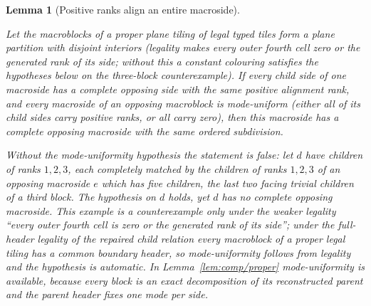 \documentclass[11pt,a4paper]{article}
\newtheorem{lemma}[definition]{Lemma}
\theoremstyle{remark}
\newcommand{\lean}[1]{}
\newcommand{\uses}[1]{}
\begin{document}
\begin{lemma}[Positive ranks align an entire macroside]
\label{lem:comp/alignment}
\lean{Tilings.Planned.alignment_complete}
\uses{def:certificate,def:tiling,def:control/substitution}
Let the macroblocks of a proper plane tiling of legal typed tiles form a
plane partition with disjoint interiors (legality makes every outer fourth
cell zero or the generated rank of its side; without this a constant
colouring satisfies the hypotheses below on the three-block counterexample).
If every child side of one macroside has a complete opposing side with the
same positive alignment rank, \emph{and every macroside of an opposing
macroblock is mode-uniform} (either all of its child sides carry positive
ranks, or all carry zero), then this macroside has a complete opposing
macroside with the same ordered subdivision.

Without the mode-uniformity hypothesis the statement is false: let $d$
have children of ranks $1,2,3$, each completely matched by the children of
ranks $1,2,3$ of an opposing macroside $e$ which has five children, the
last two facing trivial children of a third block. The hypothesis on $d$
holds, yet $d$ has no complete opposing macroside. This example is a
counterexample only under the weaker legality ``every outer fourth cell is
zero or the generated rank of its side''; under the full-header legality of
the repaired child relation every macroblock of a proper legal tiling has a
common boundary header, so mode-uniformity follows from legality and the
hypothesis is automatic. In
Lemma~\ref{lem:comp/proper} mode-uniformity is available, because every
block is an exact decomposition of its reconstructed parent and the parent
header fixes one mode per side.
\end{lemma}
\end{document}
